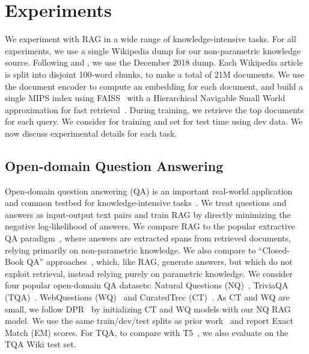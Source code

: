 \documentclass{article}
\begin{document}
\section{Experiments}
We experiment with RAG in a wide range of knowledge-intensive tasks. For all experiments, we use a single Wikipedia dump for our non-parametric knowledge source. Following \citet{lee-etal-2019-latent} and \citet{Karpukhin20dense}, we use the December 2018 dump. Each Wikipedia article is split into disjoint 100-word chunks, to make a total of 21M documents.
We use the document encoder to compute an embedding for each document, and build a single MIPS index using FAISS~\cite{JDH17} with a Hierarchical Navigable Small World approximation for fast retrieval~\cite{Malkov2016EfficientAR}.
During training, we retrieve the top  documents for each query. We consider  for training and set  for test time using dev data. We now discuss experimental details for each task.

\subsection{Open-domain Question Answering}

Open-domain question answering (QA) is an important real-world application and common testbed for knowledge-intensive tasks~\cite{guu2020realm}. 
We treat questions and answers as input-output text pairs  and train RAG by directly minimizing the negative log-likelihood of answers. 
We compare RAG to the popular extractive QA paradigm~\cite{chen_reading_2017,clark_simple_2017,lee-etal-2019-latent,Karpukhin20dense}, where answers are extracted spans from retrieved documents, relying primarily on non-parametric knowledge.
We also compare to ``Closed-Book QA'' approaches~\cite{roberts2020t5cqba}, which, like RAG, generate answers, but which do not exploit retrieval, instead relying purely on parametric knowledge.
We consider four popular open-domain QA datasets: Natural Questions (NQ)~\cite{kwiatkowski_natural_2019}, TriviaQA (TQA)~\cite{joshi_triviaqa:_2017}. WebQuestions (WQ)~\cite{berant_semantic_2013} and CuratedTrec (CT)~\cite{baudivs2015modeling}.
As CT and WQ are small, we follow DPR~\cite{Karpukhin20dense} by initializing CT and WQ models with our NQ RAG model.
We use the same train/dev/test splits as prior work~\cite{lee-etal-2019-latent,Karpukhin20dense} 
and report Exact Match (EM) scores. 
For TQA, to compare with T5~\cite{roberts2020t5cqba}, we also evaluate on the TQA Wiki test set.
\end{document}
